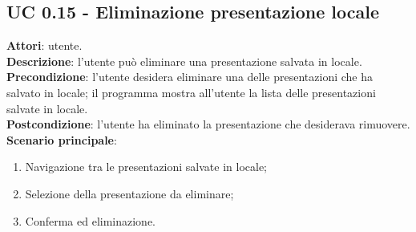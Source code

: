 \subsection{UC 0.15 - Eliminazione presentazione locale}{
	\label{uc0.15}
	\textbf{Attori}: utente.\\
	\textbf{Descrizione}: l'utente può eliminare una presentazione salvata in locale.\\
	\textbf{Precondizione}: l'utente desidera eliminare una delle presentazioni che ha salvato in locale; il programma mostra all'utente la lista delle presentazioni salvate in locale.\\
	\textbf{Postcondizione}: l'utente ha eliminato la presentazione che desiderava rimuovere.\\
	\textbf{Scenario principale}:
	\begin{enumerate}
		\item Navigazione tra le presentazioni salvate in locale;
		\item Selezione della presentazione da eliminare;
		\item Conferma ed eliminazione.
	\end{enumerate}
}